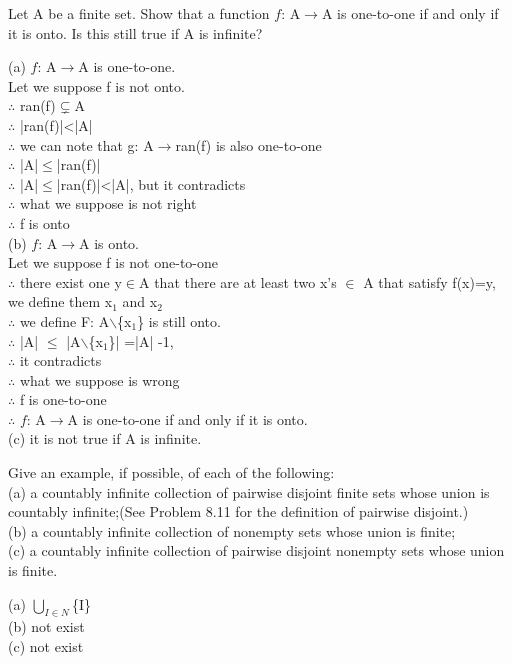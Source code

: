\documentclass[11pt, a4paper, UTF8]{ctexart}
\begin{document}
\begin{problem}[UD:21.19]
Let A be a finite set. Show that a function $f$: A$\rightarrow$A is one-to-one if and only if it is onto. Is this still true if A is infinite?
\end{problem}
\begin{solution}
(a) $f$: A$\rightarrow$A is one-to-one.\\
Let we suppose f is not onto.\\
$\therefore$ ran(f)$\subsetneq$A\\
$\therefore$ |ran(f)|<|A|\\
$\therefore$ we can note that g: A$\rightarrow$ran(f) is also one-to-one\\
$\therefore$ |A|$\le$|ran(f)|\\
$\therefore$ |A|$\le$|ran(f)|<|A|, but it contradicts\\
$\therefore$ what we suppose is not right\\
$\therefore$ f is onto\\
(b) $f$: A$\rightarrow$A is onto.\\
Let we suppose f is not one-to-one\\
$\therefore$ there exist one y$\in$A that there are at least two x's $\in$ A that satisfy f(x)=y, we define them x$_1$ and x$_2$\\
$\therefore$ we define F: A$\backslash$\{x$_1$\} is still onto.\\
$\therefore$ |A| $\le$ |A$\backslash$\{x$_1$\}| =|A| -1,\\
$\therefore$ it contradicts\\
$\therefore$ what we suppose is wrong\\
$\therefore$ f is one-to-one\\
$\therefore$ $f$: A$\rightarrow$A is one-to-one if and only if it is onto.
\\
(c) it is not true if A is infinite.\\
\end{solution}




\begin{problem}[UD:22.1]
Give an example, if possible, of each of the following:\\
(a) a countably infinite collection of pairwise disjoint finite sets whose union is countably infinite;(See Problem 8.11 for the definition of pairwise disjoint.)\\
(b) a countably infinite collection of nonempty sets whose union is finite;\\
(c) a countably infinite collection of pairwise disjoint nonempty sets whose union is finite.\\
\end{problem}
\begin{solution}
(a) $\bigcup_{I\in N}$\{I\}\\
(b) not exist\\
(c) not exist\\
\end{solution}
\end{document}
